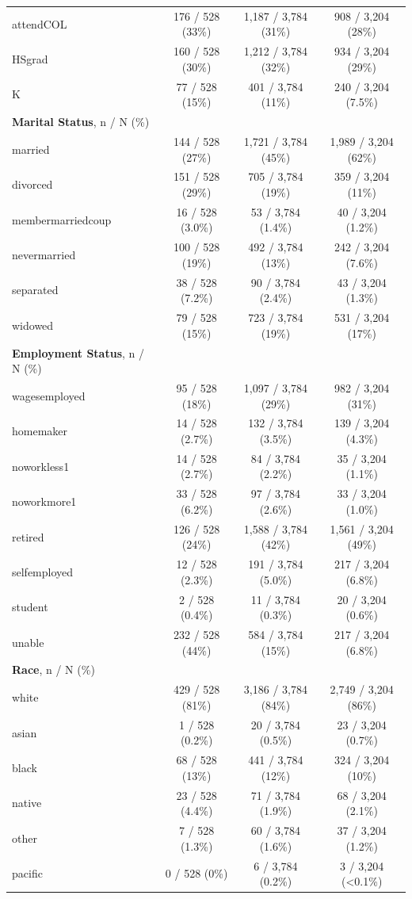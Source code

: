 \documentclass[11pt,a4paper,oldfontcommands]{memoir}
\begin{document}
{\begin{footnotesize}
\begin{longtable}{lccc}
\quad attendCOL & 176 / 528 (33\%) & 1,187 / 3,784 (31\%) & 908 / 3,204 (28\%) \\ 
\quad HSgrad & 160 / 528 (30\%) & 1,212 / 3,784 (32\%) & 934 / 3,204 (29\%) \\ 
\quad K & 77 / 528 (15\%) & 401 / 3,784 (11\%) & 240 / 3,204 (7.5\%) \\ 
\textbf{Marital Status}, n / N (\%) &  &  &  \\ 
\quad married & 144 / 528 (27\%) & 1,721 / 3,784 (45\%) & 1,989 / 3,204 (62\%) \\ 
\quad divorced & 151 / 528 (29\%) & 705 / 3,784 (19\%) & 359 / 3,204 (11\%) \\ 
\quad membermarriedcoup & 16 / 528 (3.0\%) & 53 / 3,784 (1.4\%) & 40 / 3,204 (1.2\%) \\ 
\quad nevermarried & 100 / 528 (19\%) & 492 / 3,784 (13\%) & 242 / 3,204 (7.6\%) \\ 
\quad separated & 38 / 528 (7.2\%) & 90 / 3,784 (2.4\%) & 43 / 3,204 (1.3\%) \\ 
\quad widowed & 79 / 528 (15\%) & 723 / 3,784 (19\%) & 531 / 3,204 (17\%) \\ 
\textbf{Employment Status}, n / N (\%) &  &  &  \\ 
\quad wagesemployed & 95 / 528 (18\%) & 1,097 / 3,784 (29\%) & 982 / 3,204 (31\%) \\ 
\quad homemaker & 14 / 528 (2.7\%) & 132 / 3,784 (3.5\%) & 139 / 3,204 (4.3\%) \\ 
\quad noworkless1 & 14 / 528 (2.7\%) & 84 / 3,784 (2.2\%) & 35 / 3,204 (1.1\%) \\ 
\quad noworkmore1 & 33 / 528 (6.2\%) & 97 / 3,784 (2.6\%) & 33 / 3,204 (1.0\%) \\ 
\quad retired & 126 / 528 (24\%) & 1,588 / 3,784 (42\%) & 1,561 / 3,204 (49\%) \\ 
\quad selfemployed & 12 / 528 (2.3\%) & 191 / 3,784 (5.0\%) & 217 / 3,204 (6.8\%) \\ 
\quad student & 2 / 528 (0.4\%) & 11 / 3,784 (0.3\%) & 20 / 3,204 (0.6\%) \\ 
\quad unable & 232 / 528 (44\%) & 584 / 3,784 (15\%) & 217 / 3,204 (6.8\%) \\ 
\textbf{Race}, n / N (\%) &  &  &  \\ 
\quad white & 429 / 528 (81\%) & 3,186 / 3,784 (84\%) & 2,749 / 3,204 (86\%) \\ 
\quad asian & 1 / 528 (0.2\%) & 20 / 3,784 (0.5\%) & 23 / 3,204 (0.7\%) \\ 
\quad black & 68 / 528 (13\%) & 441 / 3,784 (12\%) & 324 / 3,204 (10\%) \\ 
\quad native & 23 / 528 (4.4\%) & 71 / 3,784 (1.9\%) & 68 / 3,204 (2.1\%) \\ 
\quad other & 7 / 528 (1.3\%) & 60 / 3,784 (1.6\%) & 37 / 3,204 (1.2\%) \\ 
\quad pacific & 0 / 528 (0\%) & 6 / 3,784 (0.2\%) & 3 / 3,204 (\textless 0.1\%) \\ 
\bottomrule
\end{longtable}
\end{footnotesize}


}
\end{document}
